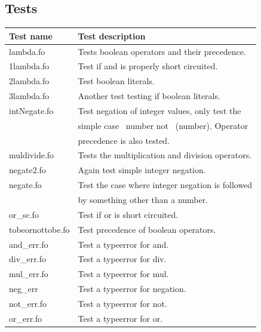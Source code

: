 \documentclass[11pt]{article}
\begin{document}
\subsection{Tests}
    \begin{tabular}{|l|l|}
        \hline
        \textbf{Test name} & \textbf{Test description}                        \\
        \hline
        lambda.fo           & Tests boolean operators and their precedence.    \\
        \hline
        1lambda.fo        & Test if and is properly short circuited.         \\
        \hline
        2lambda.fo   & Test boolean literals.                           \\
        \hline
        3lambda.fo         & Another test testing if boolean literals.        \\
        \hline
        intNegate.fo       & Test negation of integer values, only test the   \\
                           & simple case ~number not ~(number).  Operator     \\
                           & precedence is also tested.                       \\
        \hline
        muldivide.fo       & Tests the multiplication and division operators. \\
        \hline
        negate2.fo         & Again test simple integer negation.              \\
        \hline
        negate.fo          & Test the case where integer negation is followed \\
                           & by something other than a number.                \\
        \hline
        or\_sc.fo          & Test if or is short circuited.                   \\
        \hline
        tobeornottobe.fo   & Test precedence of boolean operators.            \\
        \hline
        and\_err.fo        & Test a typeerror for and.                        \\
        \hline
        div\_err.fo        & Test a typeerror for div.                        \\
        \hline
        mul\_err.fo        & Test a typeerror for mul.                        \\
        \hline
        neg\_err           & Test a typeerror for negation.                   \\
        \hline
        not\_err.fo        & Test a typeerror for not.                        \\
        \hline
        or\_err.fo         & Test a typeerror for or.                         \\
        \hline
    \end{tabular}
\end{document}
